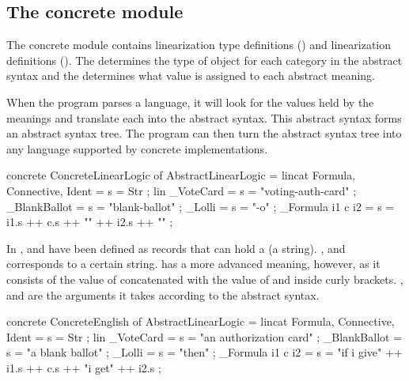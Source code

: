 \subsection{The concrete module}
\label{03_02_02}

The concrete module contains linearization type definitions () and linearization definitions (). The  determines the type of object for each category in the abstract syntax and the  determines what value is assigned to each abstract meaning. 

When the program parses a language, it will look for the values held by the meanings and translate each into the abstract syntax. This abstract syntax forms an abstract syntax tree. The program can then turn the abstract syntax tree into any language supported by concrete implementations.

\begin{lstgf}
concrete ConcreteLinearLogic of AbstractLinearLogic = {
    lincat 
        Formula, Connective, Ident = {s = Str} ;
    lin 
        _VoteCard = {s = "voting-auth-card"} ;
        _BlankBallot = {s = "blank-ballot"} ;
        _Lolli = {s = "-o"} ;
        _Formula i1 c i2 = {s = i1.s ++ c.s ++ "{" ++ i2.s ++ "}"} ;
}
\end{lstgf}

In  ,  and  have been defined as records that can hold a  (a string). ,  and  corresponds to a certain string. 
 has a more advanced meaning, however, as it consists of the value of  concatenated with the value of  and  inside curly brackets. ,  and  are the arguments it takes according to the abstract syntax.

\begin{lstgf}
concrete ConcreteEnglish of AbstractLinearLogic = {
    lincat 
        Formula, Connective, Ident = {s = Str} ;
    lin 
        _VoteCard = {s = "an authorization card"} ;
        _BlankBallot = {s = "a blank ballot"} ;
        _Lolli = {s = "then"} ;
        _Formula i1 c i2 = {s = "if i give" ++ i1.s ++ c.s ++ "i get" ++ i2.s} ;
}
\end{lstgf}

